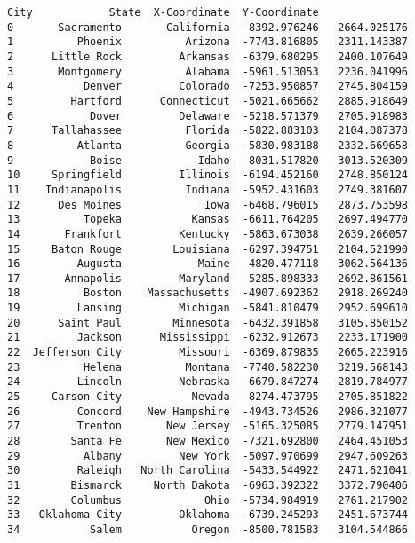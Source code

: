 \documentclass[11pt]{article}
\makeatletter
\newcommand{\boxspacing}{\kern\kvtcb@left@rule\kern\kvtcb@boxsep}
\newcommand{\prompt}[4]{
        \ttfamily\llap{{\color{#2}[#3]:\hspace{3pt}#4}}\vspace{-\baselineskip}
    }
\makeatother
\begin{document}
            \begin{tcolorbox}[breakable, size=fbox, boxrule=.5pt, pad at break*=1mm, opacityfill=0]
\prompt{Out}{outcolor}{2}{\boxspacing}
\begin{Verbatim}[commandchars=\\\{\}]
              City            State  X-Coordinate  Y-Coordinate
0       Sacramento       California  -8392.976246   2664.025176
1          Phoenix          Arizona  -7743.816805   2311.143387
2      Little Rock         Arkansas  -6379.680295   2400.107649
3       Montgomery          Alabama  -5961.513053   2236.041996
4           Denver         Colorado  -7253.950857   2745.804159
5         Hartford      Connecticut  -5021.665662   2885.918649
6            Dover         Delaware  -5218.571379   2705.918983
7      Tallahassee          Florida  -5822.883103   2104.087378
8          Atlanta          Georgia  -5830.983188   2332.669658
9            Boise            Idaho  -8031.517820   3013.520309
10     Springfield         Illinois  -6194.452160   2748.850124
11    Indianapolis          Indiana  -5952.431603   2749.381607
12      Des Moines             Iowa  -6468.796015   2873.753598
13          Topeka           Kansas  -6611.764205   2697.494770
14       Frankfort         Kentucky  -5863.673038   2639.266057
15     Baton Rouge        Louisiana  -6297.394751   2104.521990
16         Augusta            Maine  -4820.477118   3062.564136
17       Annapolis         Maryland  -5285.898333   2692.861561
18          Boston    Massachusetts  -4907.692362   2918.269240
19         Lansing         Michigan  -5841.810479   2952.699610
20      Saint Paul        Minnesota  -6432.391858   3105.850152
21         Jackson      Mississippi  -6232.912673   2233.171900
22  Jefferson City         Missouri  -6369.879835   2665.223916
23          Helena          Montana  -7740.582230   3219.568143
24         Lincoln         Nebraska  -6679.847274   2819.784977
25     Carson City           Nevada  -8274.473795   2705.851822
26         Concord    New Hampshire  -4943.734526   2986.321077
27         Trenton       New Jersey  -5165.325085   2779.147951
28        Santa Fe       New Mexico  -7321.692800   2464.451053
29          Albany         New York  -5097.970699   2947.609263
30         Raleigh   North Carolina  -5433.544922   2471.621041
31        Bismarck     North Dakota  -6963.392322   3372.790406
32        Columbus             Ohio  -5734.984919   2761.217902
33   Oklahoma City         Oklahoma  -6739.245293   2451.673744
34           Salem           Oregon  -8500.781583   3104.544866

\end{Verbatim}
\end{tcolorbox}
\end{document}
